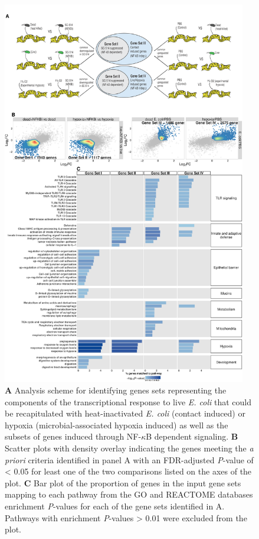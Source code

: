 \documentclass[9pt,lineo]{elife}
\begin{document}
\begin{figure}
\begin{fullwidth}
\centering
\includegraphics[width=0.95\textwidth]{./figures/figure5/figure5_multipanel.pdf}
\caption{\textbf{A} Analysis scheme for identifying genes sets representing the components of the transcriptional response to live \textit{E. coli} that could be recapitulated with heat-inactivated \textit{E. coli} (contact induced) or hypoxia (microbial-associated hypoxia induced) as well as the subsets of genes induced through NF-$\kappa$B dependent signaling. \textbf{B} Scatter plots with density overlay indicating the genes meeting the \textit{a priori} criteria identified in panel A with an FDR-adjusted \textit{P}-value of < 0.05 for least one of the two comparisons listed on the axes of the plot. \textbf{C} Bar plot of the proportion of genes in the input gene sets mapping to each pathway from the GO and REACTOME databases enrichment \textit{P}-values for each of the gene sets identified in A. Pathways with enrichment \textit{P}-values > 0.01 were excluded from the plot.}
\label{fig:fullwidth}
\end{fullwidth}
\end{figure}
\end{document}
